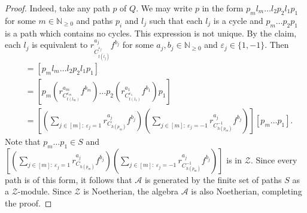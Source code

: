 \documentclass[10pt,a4paper]{amsart}
\begin{document}
\begin{proof}
	Indeed, take any path $p$ of $Q$. 
	{We may write $p$ in the form $p_m l_m \dots l_2p_2l_1p_1$ for some $m\in\mathbb N_{\geq0}$ and paths $p_i$ and $l_j$ such that each $l_j$ is a cycle and $p_m\dots p_2p_1$ is a path which contains no cycles. This expression is not unique.}
	By the claim, each $l_j$ is equivalent to $r_{C_{t(l_j)}^{\varepsilon_j}}^{a_j}f^{b_j}$ for some $a_j,b_j\in\mathbb N_{\geq0}$ and $\varepsilon_j\in\{1,-1\}$.
	Then
	\begin{align*}
		[p]&=[p_ml_m\dots l_2p_2l_1p_1] \\
		&=\left[p_m\left(
		r_{C_{t(l_m)}^{\varepsilon_m}}^{a_m}f^{b_m}\right)\dots p_2
		\left(r_{C_{t(l_1)}^{\varepsilon_1}}^{a_1}f^{b_1}\right)p_1\right]\\
		&=\left[
			\left(\sum_{j\in[m] :\ \varepsilon_j=1}r_{C_{h(p_m)}}^{a_j}f^{b_j}\right)
			\left(\sum_{j\in[m] :\ \varepsilon_j=-1}r_{C_{h(p_m)}^{-1}}^{a_j}f^{b_j}\right)\right][p_m\dots p_1].
	\end{align*}
	Note that $p_m\dots p_1\in S$ and 
$\left[ \left(\sum_{j\in[m] :\ \varepsilon_j=1}r_{C_{h(p_m)}}^{a_j}f^{b_j}\right) \left(\sum_{j\in[m] :\ \varepsilon_j=-1}r_{C_{h(p_m)}^{-1}}^{a_j}f^{b_j}\right)\right]$ is in $\mathcal Z$. Since every path is of this form, it follows that $\mathcal A$ is generated by the finite set of paths $S$ as a $\mathcal Z$-module. Since $\mathcal Z$ is Noetherian, the algebra $\mathcal A$ is also Noetherian, completing the proof.
\end{proof}
\end{document}
